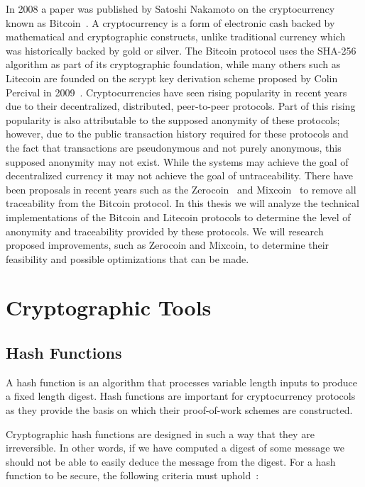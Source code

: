 \documentclass[11pt]{article}
\begin{document}
In 2008 a paper was published by Satoshi Nakamoto on the cryptocurrency known as Bitcoin~\cite{nakamoto08}.
A cryptocurrency is a form of electronic cash backed by mathematical and
cryptographic constructs, unlike traditional currency which was historically
backed by gold or silver. The Bitcoin protocol uses the SHA-256 algorithm as
part of its cryptographic foundation, while many others such as Litecoin are
founded on the scrypt key derivation scheme proposed by Colin Percival in
2009~\cite{percival09}.  Cryptocurrencies have seen rising popularity in recent
years due to their decentralized, distributed, peer-to-peer protocols. Part of
this rising popularity is also attributable to the supposed anonymity of these
protocols; however, due to the public transaction history required for these
protocols and the fact that transactions are pseudonymous and not purely
anonymous, this supposed anonymity may not exist. While the systems may achieve
the goal of decentralized currency it may not achieve the goal of
untraceability. There have been proposals in recent years such as the
Zerocoin~\cite{miers13} and Mixcoin~\cite{bonneau14} to remove all traceability
from the Bitcoin protocol. In this thesis we will analyze the technical
implementations of the Bitcoin and Litecoin protocols to determine the level of
anonymity and traceability provided by these protocols. We will research
proposed improvements, such as Zerocoin and Mixcoin, to determine their
feasibility and possible optimizations that can be made.

\section{Cryptographic Tools}

\subsection{Hash Functions}
A hash function is an algorithm that processes variable length inputs to produce
a fixed length digest. Hash functions are important for cryptocurrency protocols
as they provide the basis on which their proof-of-work schemes are constructed.

Cryptographic hash functions are designed in such a way that they are
irreversible. In other words, if we have computed a digest of some message we
should not be able to easily deduce the message from the digest. For a hash
function to be secure, the following criteria must uphold~\cite{rogaway04}:
\end{document}
